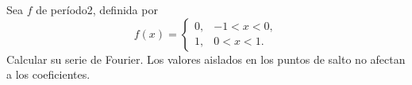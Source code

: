 Sea \(f\) de período2, definida por
\[f(x)=\begin{cases}0,&-1<x<0,\\1,&0<x<1.\end{cases}\]
Calcular su serie de Fourier. Los valores aislados en los puntos de salto no afectan a los coeficientes.
